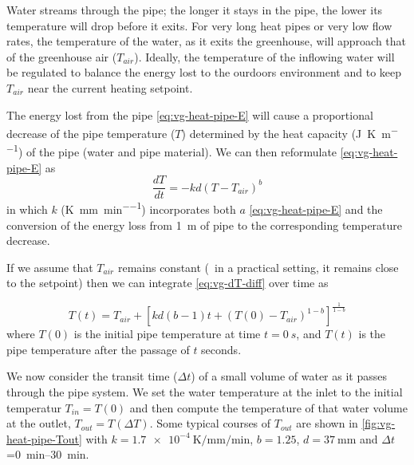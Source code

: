 Water streams through the pipe; the longer it stays in the pipe, the lower its temperature will drop before it exits. For very long heat pipes or very low flow rates, the temperature of the water, as it exits the greenhouse, will approach that of the greenhouse air ($T_{air}$). Ideally, the temperature of the inflowing water will be regulated to balance the energy lost to the ourdoors environment and to keep $T_{air}$ near the current heating setpoint.

The energy lost from the pipe \eqref{eq:vg-heat-pipe-E} will cause a proportional decrease of the pipe temperature ($T$) determined by the heat capacity (\si{\joule\per\kelvin\per\meter}) of the pipe (water and pipe material). We can then reformulate \cref{eq:vg-heat-pipe-E} as
\begin{equation}
  \frac{dT}{dt} = -kd\left(T-T_{air}\right)^b  
  \label{eq:vg-dT-diff}
\end{equation}
in which $k$ (\si{\kelvin\per\milli\meter\per\minute}) incorporates both $a$ \eqref{eq:vg-heat-pipe-E} and the conversion of the energy loss from \SI{1}{m} of pipe to the corresponding temperature decrease.

If we assume that $T_{air}$ remains constant (\ie\ in a practical setting, it remains close to the setpoint) then we can integrate \cref{eq:vg-dT-diff} over time as 

\begin{equation}
  T(t) = T_{air} + \left[ kd(b-1)t + \left( T(0)-T_{air}\right)^{1-b}  \right]^\frac{1}{1-b} 
  \label{eq:vg-T-integrated}
\end{equation}
where $T(0)$ is the initial pipe temperature at time $t=\SI{0}{s}$, and $T(t)$ is the pipe temperature after the passage of $t$ seconds. 

We now consider the transit time ($\Delta t$) of a small volume of water as it passes through the pipe system. We set the water temperature at the inlet to the initial temperatur $T_{in}=T(0)$ and then compute the temperature of that water volume at the outlet, $T_{out}=T(\Delta T)$. Some typical courses of $T_{out}$ are shown in \cref{fig:vg-heat-pipe-Tout} with $k=\SI{1.7e-4}{\kelvin\per\milli\meter\per\minute}$, $b=1.25$, $d=\SI{37}{\milli\meter}$ and $\Delta t$=\SIrange{0}{30}{\minute}.

